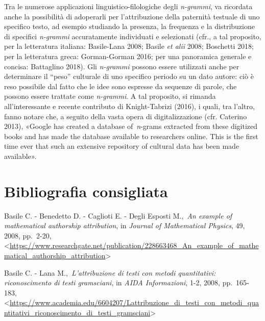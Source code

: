 \documentclass[
  b5paper,
  twoside,
  12pt,
  chapterprefix=false,
  bibliography=totocnumbered,
  parskip=false]{scrbook}
\begin{document}
Tra le numerose applicazioni linguistico-filologiche degli \emph{n-grammi},
va ricordata anche la possibilità di adoperarli per l'attribuzione della
paternità testuale di uno specifico testo, ad esempio studiando la
presenza, la frequenza e la distribuzione di specifici \emph{n-grammi}
accuratamente individuati e selezionati (cfr., a tal proposito, per la
letteratura italiana: Basile-Lana 2008; Basile \emph{et alii} 2008; Boschetti
2018; per la letteratura greca: Gorman-Gorman 2016; per una panoramica
generale e concisa: Battaglino 2018). Gli \emph{n-grammi} possono essere
utilizzati anche per determinare il \enquote{peso} culturale di uno specifico
periodo su un dato autore: ciò è reso possibile dal fatto che le idee
sono espresse da sequenze di parole, che possono essere trattate come
\emph{n-grammi}. A tal proposito, si rimanda all'interessante e recente
contributo di Knight-Tabrizi (2016), i quali, tra l'altro, fanno notare
che, a seguito della vasta opera di digitalizzazione (cfr. Caterino
2013), «Google has created a database of~\emph{n}-grams extracted from these
digitized books and has made the database available to researchers
online. This is the first time ever that such an extensive repository of
cultural data has been made available».

\hypertarget{bibliografia-consigliata-16}{%
\section*{Bibliografia consigliata}\label{bibliografia-consigliata-16}}

Basile C. - Benedetto D. - Caglioti E. - Degli Esposti M.,~\emph{An example
of mathematical authorship attribution}, in \emph{Journal of Mathematical
Physics}, 49, 2008, pp.~2-20,
\textless{}\href{https://www.researchgate.net/publication/228663468_An_example_of_mathematical_authorship_attribution}{{https://www.researchgate.net/publication/228663468\_An\_example\_of\_mathematical\_authorship\_attribution}}\textgreater{}

Basile C. - Lana M.,~\emph{L'attribuzione di testi con metodi quantitativi:
riconoscimento di testi gramsciani}, in \emph{AIDA Informazioni}, 1-2, 2008,
pp.~165-183,
\textless{}\href{https://www.academia.edu/6604207/Lattribuzione_di_testi_con_metodi_quantitativi_riconoscimento_di_testi_gramsciani}{{https://www.academia.edu/6604207/Lattribuzione\_di\_testi\_con\_metodi\_quantitativi\_riconoscimento\_di\_testi\_gramsciani}}\textgreater{}
\end{document}

